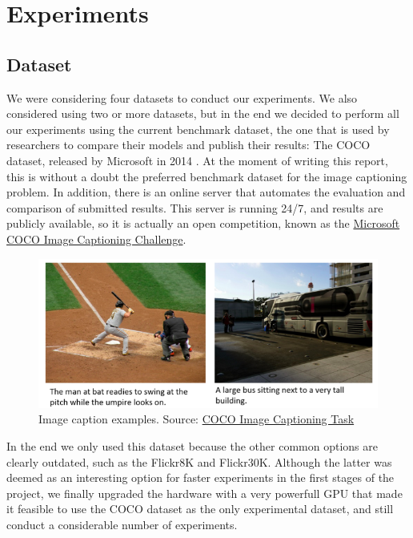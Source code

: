 \chapter{Experiments}
\label{ch:experiments}

\section{Dataset}

We were considering four datasets to conduct our experiments. We also considered using two or more datasets, but in the end we decided to perform all our experiments using the current benchmark dataset, the one that is used by researchers to compare their models and publish their results: The COCO dataset, released by Microsoft in 2014  \citet{Lin2014}. At the moment of writing this report, this is without a doubt the preferred benchmark dataset for the image captioning problem. In addition, there is an online server that automates the evaluation and comparison of submitted results. This server is running 24/7, and results are publicly available, so it is actually an open competition, known as the \href{https://competitions.codalab.org/competitions/3221}{Microsoft COCO Image Captioning Challenge}. 

\begin{figure}[hpt]
	\centering
	\includegraphics[scale=0.5]{images/ch5/captions-splash.jpg}
	\caption{Image caption examples. Source: \href{http://cocodataset.org/}{COCO Image Captioning Task}}
	\label{fig:caption-example}
\end{figure}


In the end we only used this dataset because the other common options are clearly outdated, such as the Flickr8K and Flickr30K. Although the latter was deemed as an interesting option for faster experiments in the first stages of the project, we finally upgraded the hardware with a very powerfull GPU that made it feasible to use the COCO dataset as the only experimental dataset, and still conduct a considerable number of experiments.

